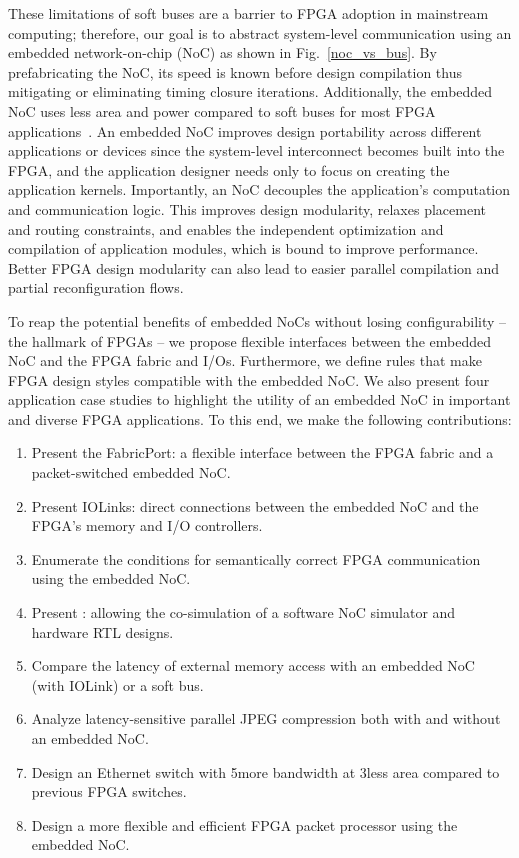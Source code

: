 These limitations of soft buses are a barrier to FPGA adoption in mainstream computing; therefore, our goal is to abstract system-level communication using an embedded network-on-chip (NoC) as shown in Fig.~\ref{noc_vs_bus}.
By prefabricating the NoC, its speed is known before design compilation thus mitigating or eliminating timing closure iterations.
Additionally, the embedded NoC uses less area and power compared to soft buses for most FPGA applications~\cite{tvlsi,micro}.
An embedded NoC improves design portability across different applications or devices since the system-level interconnect becomes built into the FPGA, and the application designer needs only to focus on creating the application kernels.
Importantly, an NoC decouples the application's computation and communication logic.
This improves design modularity, relaxes placement and routing constraints, and enables the independent optimization and compilation of application modules, which is bound to improve performance.
Better FPGA design modularity can also lead to easier parallel compilation and partial reconfiguration flows.


To reap the potential benefits of embedded NoCs without losing configurability -- the hallmark of FPGAs -- we propose flexible interfaces between the embedded NoC and the FPGA fabric and I/Os.
Furthermore, we define rules that make FPGA design styles compatible with the embedded NoC.
We also present four application case studies to highlight the utility of an embedded NoC in important and diverse FPGA applications.
To this end, we make the following contributions:%

\begin{enumerate}
\item Present the FabricPort: a flexible interface between the FPGA fabric and a packet-switched embedded NoC.
\item Present IOLinks: direct connections between the embedded NoC and the FPGA's memory and I/O controllers.
\item Enumerate the conditions for semantically correct FPGA communication using the embedded NoC. %
\item Present \rtlbook: allowing the co-simulation of a software NoC simulator and hardware RTL designs.
\item Compare the latency of external memory access with an embedded NoC (with IOLink) or a soft bus.
\item Analyze latency-sensitive parallel JPEG compression both with and without an embedded NoC.
\item Design an Ethernet switch with 5\xx more bandwidth at 3\xx less area compared to previous FPGA switches.
\item Design a more flexible and efficient FPGA packet processor using the embedded NoC.
\end{enumerate}



